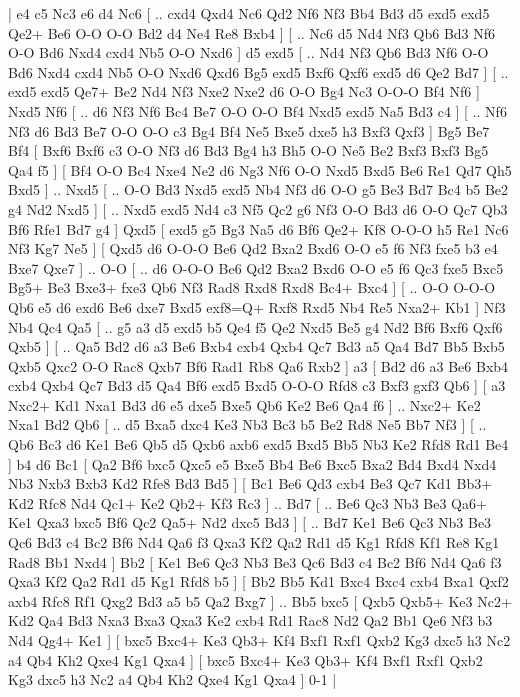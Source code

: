 \makegametitle 
|   e4   c5    Nc3   e6    d4   Nc6 [ .. cxd4  Qxd4 Nc6  Qd2 Nf6  Nf3 Bb4  Bd3 d5  exd5 exd5  Qe2+ Be6  O-O O-O  Bd2 d4  Ne4 Re8  Bxb4   ]  [ .. Nc6  d5 Nd4  Nf3 Qb6  Bd3 Nf6  O-O Bd6  Nxd4 cxd4  Nb5 O-O  Nxd6   ]  d5   exd5 [ .. Nd4  Nf3 Qb6  Bd3 Nf6  O-O Bd6  Nxd4 cxd4  Nb5 O-O  Nxd6 Qxd6  Bg5 exd5  Bxf6 Qxf6  exd5 d6  Qe2 Bd7   ]  [ .. exd5  exd5 Qe7+  Be2 Nd4  Nf3 Nxe2  Nxe2 d6  O-O Bg4  Nc3 O-O-O  Bf4 Nf6   ]  Nxd5   Nf6    [ .. d6  Nf3 Nf6  Bc4 Be7  O-O O-O  Bf4 Nxd5  exd5 Na5  Bd3 c4   ]  [ .. Nf6  Nf3 d6  Bd3 Be7  O-O O-O  c3 Bg4  Bf4 Ne5  Bxe5 dxe5  h3 Bxf3  Qxf3   ]  Bg5   Be7    Bf4 [  Bxf6 Bxf6  c3 O-O  Nf3 d6  Bd3 Bg4  h3 Bh5  O-O Ne5  Be2 Bxf3  Bxf3 Bg5  Qa4 f5   ]  [  Bf4 O-O  Bc4 Nxe4  Ne2 d6  Ng3 Nf6  O-O Nxd5  Bxd5 Be6  Re1 Qd7  Qh5 Bxd5   ] .. Nxd5 [ .. O-O  Bd3 Nxd5  exd5 Nb4  Nf3 d6  O-O g5  Be3 Bd7  Bc4 b5  Be2 g4  Nd2 Nxd5   ]  [ .. Nxd5  exd5 Nd4  c3 Nf5  Qc2 g6  Nf3 O-O  Bd3 d6  O-O Qc7  Qb3 Bf6  Rfe1 Bd7  g4   ]  Qxd5 [  exd5 g5  Bg3 Na5  d6 Bf6  Qe2+ Kf8  O-O-O h5  Re1 Nc6  Nf3 Kg7  Ne5   ]  [  Qxd5 d6  O-O-O Be6  Qd2 Bxa2  Bxd6 O-O  e5 f6  Nf3 fxe5  b3 e4  Bxe7 Qxe7   ] .. O-O [ .. d6  O-O-O Be6  Qd2 Bxa2  Bxd6 O-O  e5 f6  Qc3 fxe5  Bxc5 Bg5+  Be3 Bxe3+  fxe3 Qb6  Nf3 Rad8  Rxd8 Rxd8  Bc4+ Bxc4   ]  [ .. O-O  O-O-O Qb6  e5 d6  exd6 Be6  dxe7 Bxd5  exf8=Q+ Rxf8  Rxd5 Nb4  Re5 Nxa2+  Kb1   ]  Nf3   Nb4    Qc4   Qa5 [ .. g5  a3 d5  exd5 b5  Qe4 f5  Qe2 Nxd5  Be5 g4  Nd2 Bf6  Bxf6 Qxf6  Qxb5   ]  [ .. Qa5  Bd2 d6  a3 Be6  Bxb4 cxb4  Qxb4 Qc7  Bd3 a5  Qa4 Bd7  Bb5 Bxb5  Qxb5 Qxc2  O-O Rac8  Qxb7 Bf6  Rad1 Rb8  Qa6 Rxb2   ]  a3 [  Bd2 d6  a3 Be6  Bxb4 cxb4  Qxb4 Qc7  Bd3 d5  Qa4 Bf6  exd5 Bxd5  O-O-O Rfd8  c3 Bxf3  gxf3 Qb6   ]  [  a3 Nxc2+  Kd1 Nxa1  Bd3 d6  e5 dxe5  Bxe5 Qb6  Ke2 Be6  Qa4 f6   ] .. Nxc2+    Ke2   Nxa1    Bd2   Qb6 [ .. d5  Bxa5 dxc4  Ke3 Nb3  Bc3 b5  Be2 Rd8  Ne5 Bb7  Nf3   ]  [ .. Qb6  Bc3 d6  Ke1 Be6  Qb5 d5  Qxb6 axb6  exd5 Bxd5  Bb5 Nb3  Ke2 Rfd8  Rd1 Be4   ]  b4   d6    Bc1 [  Qa2 Bf6  bxc5 Qxc5  e5 Bxe5  Bb4 Be6  Bxc5 Bxa2  Bd4 Bxd4  Nxd4 Nb3  Nxb3 Bxb3  Kd2 Rfe8  Bd3 Bd5   ]  [  Bc1 Be6  Qd3 cxb4  Be3 Qc7  Kd1 Bb3+  Kd2 Rfc8  Nd4 Qc1+  Ke2 Qb2+  Kf3 Rc3   ] .. Bd7 [ .. Be6  Qc3 Nb3  Be3 Qa6+  Ke1 Qxa3  bxc5 Bf6  Qc2 Qa5+  Nd2 dxc5  Bd3   ]  [ .. Bd7  Ke1 Be6  Qc3 Nb3  Be3 Qc6  Bd3 c4  Bc2 Bf6  Nd4 Qa6  f3 Qxa3  Kf2 Qa2  Rd1 d5  Kg1 Rfd8  Kf1 Re8  Kg1 Rad8  Bb1 Nxd4   ]  Bb2 [  Ke1 Be6  Qc3 Nb3  Be3 Qc6  Bd3 c4  Bc2 Bf6  Nd4 Qa6  f3 Qxa3  Kf2 Qa2  Rd1 d5  Kg1 Rfd8  b5   ]  [  Bb2 Bb5  Kd1 Bxc4  Bxc4 cxb4  Bxa1 Qxf2  axb4 Rfc8  Rf1 Qxg2  Bd3 a5  b5 Qa2  Bxg7   ] .. Bb5    bxc5 [  Qxb5 Qxb5+  Ke3 Nc2+  Kd2 Qa4  Bd3 Nxa3  Bxa3 Qxa3  Ke2 cxb4  Rd1 Rac8  Nd2 Qa2  Bb1 Qe6  Nf3 b3  Nd4 Qg4+  Ke1   ]  [  bxc5 Bxc4+  Ke3 Qb3+  Kf4 Bxf1  Rxf1 Qxb2  Kg3 dxc5  h3 Nc2  a4 Qb4  Kh2 Qxe4  Kg1 Qxa4   ]  [  bxc5 Bxc4+  Ke3 Qb3+  Kf4 Bxf1  Rxf1 Qxb2  Kg3 dxc5  h3 Nc2  a4 Qb4  Kh2 Qxe4  Kg1 Qxa4   ] 0-1  |
